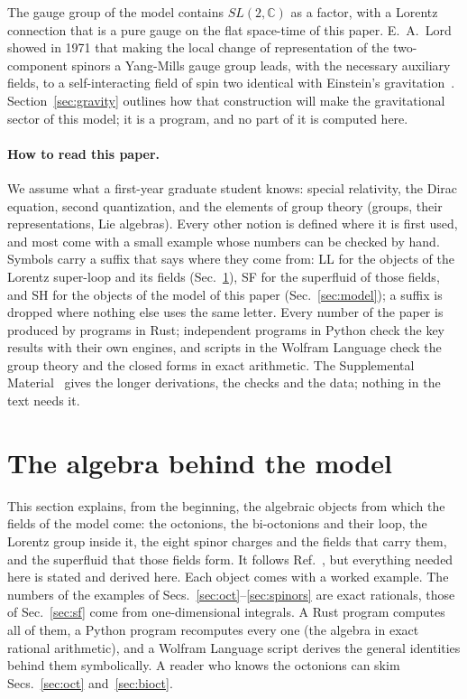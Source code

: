 \documentclass[aps,prd,twocolumn,superscriptaddress,nofootinbib,floatfix,longbibliography]{revtex4-2}
\begin{document}
The gauge group of the model contains $SL(2,\mathbb C)$ as a factor, with a Lorentz connection that is a pure gauge on
the flat space-time of this paper. E.~A.~Lord showed in 1971 that making the local change of representation of the
two-component spinors a Yang-Mills gauge group leads, with the necessary auxiliary fields, to a self-interacting field
of spin two identical with Einstein's gravitation~\cite{Lord1971}. Section~\ref{sec:gravity} outlines how that
construction will make the gravitational sector of this model; it is a program, and no part of it is computed here.

\paragraph*{How to read this paper.} We assume what a first-year graduate student knows: special relativity, the Dirac
equation, second quantization, and the elements of group theory (groups, their representations, Lie algebras). Every
other notion is defined where it is first used, and most come with a small example whose numbers can be checked by
hand. Symbols carry a suffix that says where they come from: LL for the objects of the Lorentz super-loop and its fields
(Sec.~\ref{sec:algebra}), SF for the superfluid of those fields, and SH for the objects of the model of this paper
(Sec.~\ref{sec:model}); a suffix is dropped where nothing else uses the same letter. Every number of the paper is
produced by programs in Rust; independent programs in Python check the key results with their own engines, and scripts
in the Wolfram Language check the group theory and the closed forms in exact arithmetic. The Supplemental
Material~\cite{SM} gives the longer derivations, the checks and the data; nothing in the text needs it.

\section{The algebra behind the model}
\label{sec:algebra}

This section explains, from the beginning, the algebraic objects from which the fields of the model come: the
octonions, the bi-octonions and their loop, the Lorentz group inside it, the eight spinor charges and the fields that
carry them, and the superfluid that those fields form. It follows Ref.~\cite{Nash2026}, but everything needed here is
stated and derived here. Each object comes with a worked example. The numbers of the examples of
Secs.~\ref{sec:oct}--\ref{sec:spinors} are exact rationals, those of Sec.~\ref{sec:sf} come from one-dimensional
integrals. A Rust program computes all of them, a Python program recomputes every one (the algebra in exact rational
arithmetic), and a Wolfram Language script derives the general identities behind them symbolically. A reader who knows
the octonions can skim Secs.~\ref{sec:oct} and~\ref{sec:bioct}.
\end{document}
